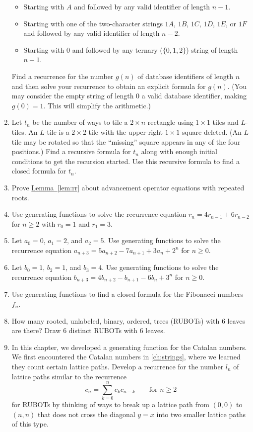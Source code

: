 \begin{enumerate}
\begin{itemize}
  \item Starting with $A$ and followed by any valid identifier of
    length $n-1$.
  \item Starting with one of the two-character strings $1A$, $1B$,
    $1C$, $1D$, $1E$, or $1F$ and followed by any valid identifier of
    length $n-2$.
  \item Starting with $0$ and followed by any ternary ($\{0,1,2\}$)
    string of length $n-1$.
  \end{itemize}
  Find a recurrence for the number $g(n)$ of database identifiers of
  length $n$ and then solve your recurrence to obtain an explicit
  formula for $g(n)$. (You may consider the empty string of length $0$
  a valid database identifier, making $g(0)=1$. This will simplify the
  arithmetic.)
\item Let $t_n$ be the number of ways to tile a $2\times n$ rectangle
  using $1\times 1$ tiles and $L$-tiles. An $L$-tile is a $2\times 2$
  tile with the upper-right $1\times 1$ square deleted. (An $L$ tile
  may be rotated so that the ``missing'' square appears in any of the
  four positions.) Find a recursive formula for $t_n$ along with
  enough initial conditions to get the recursion started. Use this
  recursive formula to find a closed formula for $t_n$.
\item Prove \hyperref[lem:rr]{Lemma~\ref*{lem:rr}} about advancement
  operator equations with repeated roots.
\item Use generating functions to solve the recurrence equation
  $r_n=4r_{n-1}+6r_{n-2}$ for $n\geq 2$ with $r_0=1$ and $r_1=3$.
\item Let $a_0=0$, $a_1=2$, and $a_2=5$. Use generating functions to
  solve the recurrence equation $a_{n+3} = 5a_{n+2} - 7a_{n+1}+3a_n +
  2^n$ for $n\geq 0$.
\item Let $b_0=1$, $b_2=1$, and $b_3=4$. Use generating functions to
  solve the recurrence equation $b_{n+3} = 4b_{n+2}-b_{n+1}-6b_n +
  3^n$ for $n\geq 0$.
\item Use generating functions to find a closed formula for the
  Fibonacci numbers $f_n$. 
\item How many rooted, unlabeled, binary, ordered, trees (RUBOTs) with
  $6$ leaves are there? Draw $6$ distinct RUBOTs with $6$ leaves.
\item In this chapter, we developed a generating function for the
  Catalan numbers. We first encountered the Catalan numbers in
  \autoref{ch:strings}, where we learned they count certain lattice
  paths. Develop a recurrence for the number $l_n$ of lattice paths
  similar to the recurrence
  \[c_n = \sum_{k=0}^n c_k c_{n-k}\qquad \text{for }n\geq 2\]
  for RUBOTs by thinking of ways to break up a lattice path from
  $(0,0)$ to $(n,n)$ that does not cross the diagonal $y=x$ into two
  smaller lattice paths of this type.

\end{enumerate}


